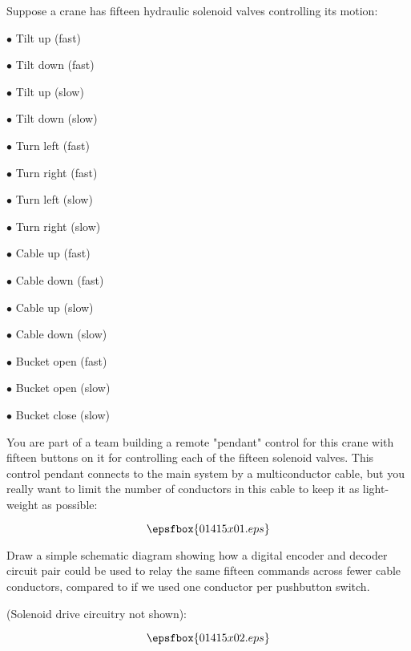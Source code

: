 

Suppose a crane has fifteen hydraulic solenoid valves controlling its motion:

\medskip
\item{$\bullet$} Tilt up (fast)
\item{$\bullet$} Tilt down (fast)
\item{$\bullet$} Tilt up (slow)
\item{$\bullet$} Tilt down (slow)
\item{$\bullet$} Turn left (fast)
\item{$\bullet$} Turn right (fast)
\item{$\bullet$} Turn left (slow)
\item{$\bullet$} Turn right (slow)
\item{$\bullet$} Cable up (fast)
\item{$\bullet$} Cable down (fast)
\item{$\bullet$} Cable up (slow)
\item{$\bullet$} Cable down (slow)
\item{$\bullet$} Bucket open (fast)
\item{$\bullet$} Bucket open (slow)
\item{$\bullet$} Bucket close (slow)
\medskip

You are part of a team building a remote "pendant" control for this crane with fifteen buttons on it for controlling each of the fifteen solenoid valves.  This control pendant connects to the main system by a multiconductor cable, but you really want to limit the number of conductors in this cable to keep it as light-weight as possible:

$$\epsfbox{01415x01.eps}$$

Draw a simple schematic diagram showing how a digital encoder and decoder circuit pair could be used to relay the same fifteen commands across fewer cable conductors, compared to if we used one conductor per pushbutton switch.







(Solenoid drive circuitry not shown):

$$\epsfbox{01415x02.eps}$$

